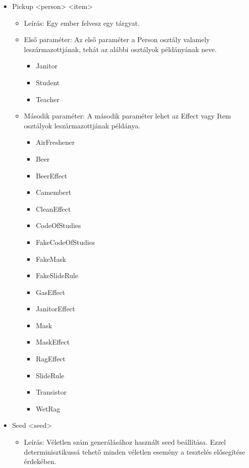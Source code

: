 \begin{itemize}
    \item Pickup <person> <item>
    \begin{itemize}
        \item Leírás: Egy ember felvesz egy tárgyat.
        \item Első paraméter: Az első paraméter a Person osztály valamely leszármazottjának, tehát az alábbi osztályok példányának neve. 
        \begin{itemize}
            \item Janitor
            \item Student
            \item Teacher
        \end{itemize}
        \item Második paraméter: A második paraméter lehet az Effect vagy Item osztályok leszármazottjának példánya.
        \begin{itemize}
            \item AirFreshener
            \item Beer
            \item BeerEffect
            \item Camembert
            \item CleanEffect
            \item CodeOfStudies
            \item FakeCodeOfStudies
            \item FakeMask
            \item FakeSlideRule
            \item GasEffect
            \item JanitorEffect
            \item Mask
            \item MaskEffect
            \item RagEffect
            \item SlideRule
            \item Transistor
            \item WetRag
        \end{itemize}
    \end{itemize}
    
    \item Seed <seed>
    \begin{itemize}
        \item Leírás: Véletlen szám generálásához használt seed beállítása. Ezzel determinisztikussá tehető minden véletlen esemény a tesztelés elősegítése érdekében.
    \end{itemize}


\end{itemize}
